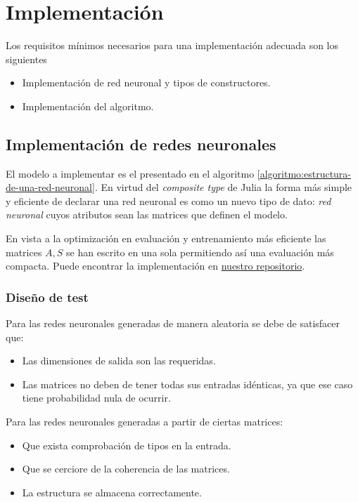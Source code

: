
\section{Implementación}
\label{ch07:Implementar} 

Los requisitos mínimos necesarios para una implementación adecuada son los siguientes
\begin{itemize}
    \item Implementación de red neuronal y tipos de constructores.
    \item Implementación del algoritmo. 
\end{itemize}

\subsection{Implementación de redes neuronales}

El modelo  a implementar es el presentado en el algoritmo \ref{algoritmo:estructura-de-una-red-neuronal}. En virtud del \textit{composite type} de Julia  la forma más simple y eficiente de 
declarar una red neuronal es como un nuevo tipo de dato: \textit{red neuronal} cuyos atributos sean las matrices que definen el modelo. 

En vista a la optimización en evaluación y 
entrenamiento más eficiente las matrices 
$A, S$ se han escrito en una sola permitiendo así una evaluación más compacta. 
Puede encontrar la implementación 
en \href{https://github.com/BlancaCC/TFG-Estudio-de-las-redes-neuronales/tree/main/OptimizedNeuralNetwork.jl/src}{nuestro repositorio}.
\subsubsection{Diseño de test} 
Para las redes neuronales generadas de manera aleatoria se debe de satisfacer que: 
\begin{itemize}
    \item Las dimensiones de salida son las requeridas.
    \item Las matrices no deben de tener todas sus entradas idénticas, ya que ese caso tiene probabilidad nula de ocurrir. 
\end{itemize}

Para las redes neuronales generadas a partir de 
ciertas matrices: 
\begin{itemize}
    \item Que exista comprobación de tipos en la entrada.
    \item Que se cerciore de la coherencia de las matrices.
    \item  La estructura se almacena correctamente. 
\end{itemize}

